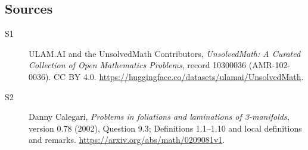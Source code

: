 \documentclass[11pt]{article}
\begin{document}
\subsection{Sources}
\begin{description}
\item[\hypertarget{source:10300036:1}{S1}] ULAM.AI and the UnsolvedMath Contributors, \emph{UnsolvedMath: A Curated Collection of Open Mathematics Problems}, record 10300036 (AMR-102-0036). CC BY 4.0. \url{https://huggingface.co/datasets/ulamai/UnsolvedMath}.
\item[\hypertarget{source:10300036:2}{S2}] Danny Calegari, \emph{Problems in foliations and laminations of 3-manifolds}, version 0.78 (2002), Question 9.3; Definitions 1.1--1.10 and local definitions and remarks. \url{https://arxiv.org/abs/math/0209081v1}.
\end{description}
\label{end:10300036}
\end{document}
